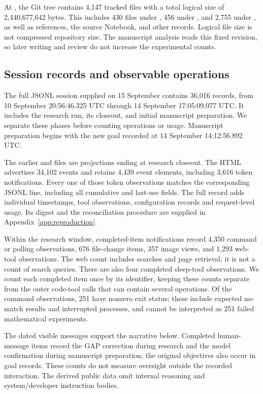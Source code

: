At \snapshot{}, the Git tree contains 4,147 tracked files with a total
logical size of 2,440,677,642 bytes. This includes 430 files under
, 456 under , and 2,755 under
, as well as references, the source Notebook, and
other records. Logical file size is not compressed repository size.
The manuscript analysis reads this fixed revision, so later writing
and review do not increase the experimental counts.

\subsection{Session records and observable operations}

The full JSONL session supplied on 15 September contains 36,016
records, from 10 September 20:56:46.325 UTC through 14 September
17:05:09.077 UTC. It includes the research run, its closeout, and
initial manuscript preparation. We separate these phases before
counting operations or usage. Manuscript preparation begins with the
new goal recorded at 14 September 14:12:56.892 UTC.

The earlier  and  files
are projections ending at research closeout. The HTML advertises
34,102 events and retains 4,439 event elements, including 3,616 token
notifications. Every one of those token observations matches the
corresponding JSONL line, including all cumulative and last-use fields.
The full record adds individual timestamps, tool observations,
configuration records and request-level usage. Its digest and the
reconciliation procedure are supplied in Appendix~\ref{app:reproduction}.

Within the research window, completed-item notifications record
4,350 command or polling observations, 676 file-change items, 357
image views, and 1,293 web-tool observations. The web count includes
searches and page retrieval; it is not a count of search queries.
There are also four completed sleep-tool observations. We count each
completed item once by its identifier, keeping these counts separate
from the outer code-tool calls that can contain several operations.
Of the command observations, 251 have nonzero exit status; these include
expected no-match results and interrupted processes, and cannot be
interpreted as 251 failed mathematical experiments.

The dated visible messages support the narrative below. Completed
human-message items record the GAP correction during research and the
model confirmation during manuscript preparation; the original
objectives also occur in goal records. These counts do not measure
oversight outside the recorded interaction. The derived public data
omit internal reasoning and system/developer instruction bodies.

